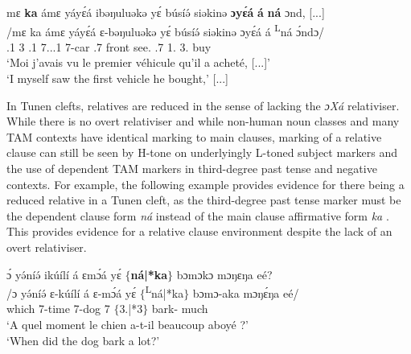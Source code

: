 \documentclass[output=paper,colorlinks,citecolor=brown
]{langscibook}
\begin{document}
\ea
\label{relativeinyas}
\glll
{\db}mɛ \textbf{ka} ámɛ yáyɛ́á ibəŋuluəkə yɛ́ búsíə́ siəkinə \textbf{ɔyɛ́á} \textbf{á} \textbf{\ds{}ná} ɔnd, [...] \\
/mɛ ka ámɛ yáyɛ́á ɛ-bəŋuluəkə yɛ́ búsíə́ siəkinə ɔyɛ́á á \textsuperscript{L}ná ɔ́ndɔ/ \\
{\db}\SM{}.1\SG{} \PST{}3{} \PRO{}.1\SG{} 7{}.\PRO{}.\POSS{}.1{} 7-car \ASS{}.7{} front see.\DUR{} \REL{}.7{} 1\SM{}.\REL{} \PST{}3.\REL{} buy \\
\glt
`Moi j'avais vu le premier véhicule qu'il a acheté, [...]' \\ `I myself saw the first vehicle he bought,' [...] \jambox*{[PM 1045] }

\z

In Tunen clefts, relatives are reduced in the sense of lacking the \textit{ɔXá} relativiser. While there is no overt relativiser and while non-human noun classes and many TAM contexts have identical marking to main clauses, marking of a relative clause can still be seen by H-tone on underlyingly L-toned subject markers and the use of dependent TAM markers in third-degree past tense and negative contexts. For example, the following example provides evidence for there being a reduced relative in a Tunen cleft, as the third-degree past tense marker must be the dependent clause form \textit{\ds{}ná} instead of the main clause affirmative form \textit{ka} . This provides evidence for a relative clause environment despite the lack of an overt relativiser.

\ea
\label{ex:whichmomentbarkq}
\glll
{\db}ɔ́	yə́níə́	ikúílí	á	ɛmɔ́á	yɛ́ \textbf{$\{$\ds{}ná|*ka}$\}$ bɔmɔkɔ	mɔŋɛŋa	eé? \\
/ɔ	yə́níə́	ɛ-kúílí	á	ɛ-mɔ́á	yɛ́ $\{$\textsuperscript{L}ná|*ka$\}$ bɔmɔ-aka	mɔŋɛ́ŋa	eé/ \\
{\db}\PREP{}	which	7-time	\COP{}	7-dog	7\SM{} $\{$\PST{}3.\REL{}|*\PST{}3{}$\}$ bark-\DUR{}	much	\Q{} \\
\glt
`A quel moment le chien a-t-il beaucoup aboyé ?'\\ `When did the dog bark a lot?' \jambox*{[PM, 1255--6] }


\z
\end{document}
